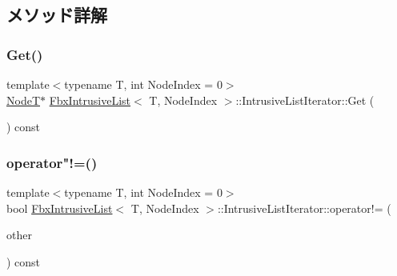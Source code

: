 \subsection{メソッド詳解}
\mbox{\label{class_fbx_intrusive_list_1_1_intrusive_list_iterator_ae4510214381d82038e1b2c37cd3f0c20}} 
\subsubsection{\texorpdfstring{Get()}{Get()}}
{\footnotesize\ttfamily template$<$typename T, int Node\+Index = 0$>$ \\
\hyperlink{class_fbx_intrusive_list_a6ffda382a6d029a042cbb0110853680c}{NodeT}$\ast$ \hyperlink{class_fbx_intrusive_list}{Fbx\+Intrusive\+List}$<$ T, Node\+Index $>$\+::Intrusive\+List\+Iterator\+::\+Get (\begin{DoxyParamCaption}{ }\end{DoxyParamCaption}) const}

\mbox{\label{class_fbx_intrusive_list_1_1_intrusive_list_iterator_a2b302e93dfb6cff66399273730d24c84}} 
\subsubsection{\texorpdfstring{operator"!=()}{operator!=()}}
{\footnotesize\ttfamily template$<$typename T, int Node\+Index = 0$>$ \\
bool \hyperlink{class_fbx_intrusive_list}{Fbx\+Intrusive\+List}$<$ T, Node\+Index $>$\+::Intrusive\+List\+Iterator\+::operator!= (\begin{DoxyParamCaption}\item[{const \hyperlink{class_fbx_intrusive_list_1_1_intrusive_list_iterator}{Intrusive\+List\+Iterator} \&}]{other }\end{DoxyParamCaption}) const}

